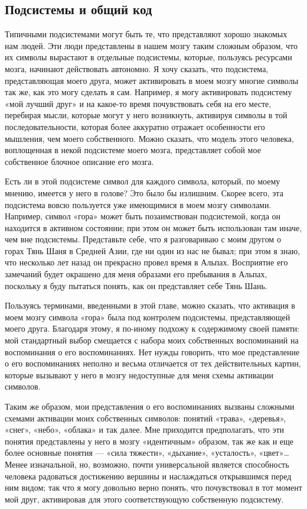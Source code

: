 \documentclass[../main.tex]{subfiles}
\begin{document}
\subsection{Подсистемы и общий код}

Типичными подсистемами могут быть те, что представляют хорошо знакомых нам людей. Эти люди представлены в нашем мозгу таким сложным образом, что их символы вырастают в отдельные подсистемы, которые, пользуясь ресурсами мозга, начинают действовать автономно. Я хочу сказать, что подсистема, представляющая моего друга, может активировать в моем мозгу многие символы так же, как это могу сделать я сам. Например, я могу активировать подсистему «мой лучший друг» и на какое-то время почувствовать себя на его месте, перебирая мысли, которые могут у него возникнуть, активируя символы в той последовательности, которая более аккуратно отражает особенности его мышления, чем моего собственного. Можно сказать, что модель этого человека, воплощенная в некой подсистеме моего мозга, представляет собой мое собственное блочное описание его мозга.

Есть ли в этой подсистеме символ для каждого символа, который, по моему мнению, имеется у него в голове? Это было бы излишним. Скорее всего, эта подсистема вовсю пользуется уже имеющимися в моем мозгу символами. Например, символ «гора» может быть позаимствован подсистемой, когда он находится в активном состоянии; при этом он может быть использован там иначе, чем вне подсистемы. Представьте себе, что я разговариваю с моим другом о горах Тянь Шаня в Средней Азии, где ни один из нас не бывал; при этом я знаю, что несколько лет назад он прекрасно провел время в Альпах. Восприятие его замечаний будет окрашено для меня образами его пребывания в Альпах, поскольку я буду пытаться понять, как он представляет себе Тянь Шань.

Пользуясь терминами, введенными в этой главе, можно сказать, что активация в моем мозгу символа «гора» была под контролем подсистемы, представляющей моего друга. Благодаря этому, я по-иному подхожу к содержимому своей памяти: мой стандартный выбор смещается с набора моих собственных воспоминаний на воспоминания о его воспоминаниях. Нет нужды говорить, что мое представление о его воспоминаниях неполно и весьма отличается от тех действительных картин, которые вызывают у него в мозгу недоступные для меня схемы активации символов.

Таким же образом, мои представления о его воспоминаниях вызваны сложными схемами активации моих собственных символов: понятий «трава», «деревья», «снег», «небо», «облака» и так далее. Мне приходится предполагать, что эти понятия представлены у него в мозгу «идентичным» образом, так же как и еще более основные понятия --- «сила тяжести», «дыхание», «усталость», «цвет»\ldots{} Менее изначальной, но, возможно, почти универсальной является способность человека радоваться достижению вершины и наслаждаться открывшимся перед ним видом; так что я могу довольно верно понять, что почувствовал в тот момент мой друг, активировав для этого соответствующую собственную подсистему.
\end{document}

